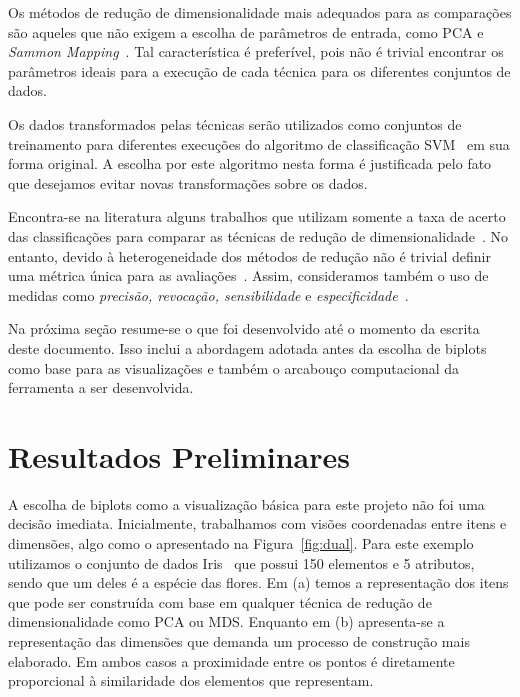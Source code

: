 Os métodos de redução de dimensionalidade mais adequados
para as comparações são aqueles que não exigem a escolha de
parâmetros de entrada, como PCA e \emph{Sammon
Mapping}~\cite{Sammon1969}. Tal característica é preferível,
pois não é trivial encontrar os parâmetros ideais para a
execução de cada técnica para os diferentes conjuntos de
dados.

Os dados transformados pelas técnicas serão utilizados como
conjuntos de treinamento para diferentes execuções do
algoritmo de classificação SVM~\cite{Cortes1995} em sua
forma original. A escolha por este algoritmo nesta forma é
justificada pelo fato que desejamos evitar novas
transformações sobre os dados.  

Encontra-se na literatura alguns trabalhos que utilizam somente a
taxa de acerto das classificações para comparar as técnicas
de redução de dimensionalidade~\cite{Guyon2003,Joshi2007}.
No entanto, devido à heterogeneidade dos métodos de redução
não é trivial definir uma métrica única para as
avaliações~\cite{Medeiros2011}. Assim, consideramos também o
uso de medidas como \emph{precisão, revocação,
sensibilidade} e \emph{especificidade}~\cite{Mitchell1997}.

Na próxima seção resume-se o que foi desenvolvido
até o momento da escrita deste documento. Isso inclui a
abordagem adotada antes da escolha de biplots como base para
as visualizações e também o arcabouço computacional da
ferramenta a ser desenvolvida.

\section{Resultados Preliminares}

A escolha de biplots como a visualização básica para este
projeto não foi uma decisão imediata. Inicialmente,
trabalhamos com visões coordenadas entre itens e
dimensões, algo como o apresentado na Figura~\ref{fig:dual}.
Para este exemplo utilizamos o conjunto de dados
Iris~\cite{Fisher1936} que possui 150 elementos e 5
atributos, sendo que um deles é a espécie das flores. Em
(a) temos a representação dos itens que pode ser construída
com base em qualquer técnica de redução de dimensionalidade
como PCA ou MDS. Enquanto em (b) apresenta-se a representação das
dimensões que demanda um processo de construção mais
elaborado. Em ambos casos a proximidade entre os
pontos é diretamente proporcional à similaridade dos
elementos que representam.

